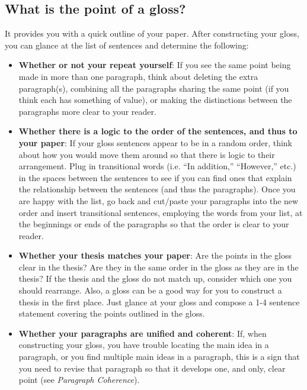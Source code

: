   	        
\subsection{What is the point of a gloss?}

It provides you with a quick outline of your paper. After constructing your gloss, you can glance at the list of sentences and determine the following:
 \begin{itemize}
        
\item \textbf{Whether or not your repeat yourself}: If you see the same point being made in 
more than one paragraph, think about deleting the extra paragraph(s), 
combining all the paragraphs sharing the same point (if you think each has 
something of value), or making the distinctions between the paragraphs more 
clear to your reader.
        
\item \textbf{Whether there is a logic to the order of the sentences, and thus to your paper}:
If your gloss sentences appear to be in a random order, think about how you would move them around so that there is logic to their arrangement.  Plug in transitional words (i.e. “In addition,” “However,” etc.)  in the spaces between the sentences to see if you can find ones that explain the relationship between the sentences (and thus the paragraphs). Once you are happy with the list, go back and cut/paste your paragraphs into the new order and insert transitional sentences, employing the words from your list, at the beginnings or ends of the paragraphs so that the order is clear to your reader.

\item \textbf{Whether your thesis matches your paper}: Are the points in the gloss clear in the thesis? Are they in the same order in the gloss as they are in the thesis? If the thesis and the gloss do not match up, consider which one you should rearrange. Also, a gloss can be a good way for you to construct a thesis in the first place. Just glance at your gloss and compose a 1-4 sentence statement covering the points outlined in the gloss.

\item \textbf{Whether your paragraphs are unified and coherent}: If, when constructing your 
gloss, you have trouble locating the main idea in a paragraph, or you find multiple main ideas in a paragraph, this is a sign that you need to revise that paragraph so that it develops one, and only, clear point (see \emph{Paragraph Coherence}).
\end{itemize}

